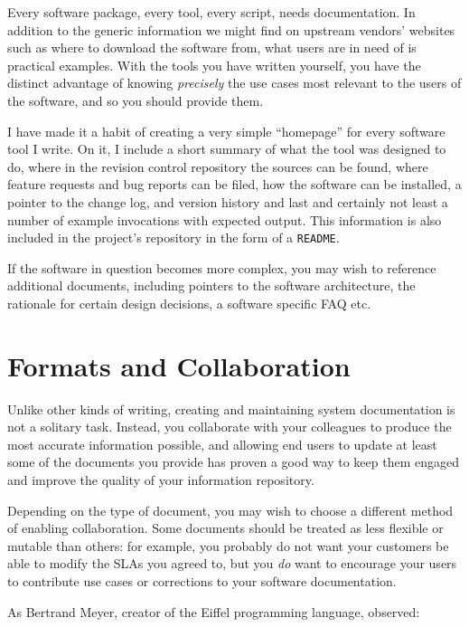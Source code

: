 Every software package, every tool, every script,
needs documentation.  In addition to the generic
information we might find on upstream vendors'
websites such as where to download the software from,
what users are in need of is practical examples.  With
the tools you have written yourself, you have the
distinct advantage of knowing {\em precisely} the use
cases most relevant to the users of the software, and
so you should provide them.

I have made it a habit of creating a very simple
``homepage'' for every software tool I write.  On it,
I include a short summary of what the tool was
designed to do, where in the revision control
repository the sources can be found, where feature
requests and bug reports can be filed, how the
software can be installed, a pointer to the change
log, and version history and last and certainly not
least a number of example invocations with expected
output.  This information is also included in the
project's repository in the form of a {\tt README}.

If the software in question becomes more complex, you
may wish to reference additional documents, including
pointers to the software architecture, the rationale
for certain design decisions, a software specific FAQ
etc.

\section{Formats and Collaboration}
\label{documentation:formats-and-collaboration}

Unlike other kinds of writing, creating and
maintaining system documentation is not a solitary
task.  Instead, you collaborate with your colleagues
to produce the most accurate information possible, and
allowing end users to update at least some of the
documents you provide has proven a good way to keep
them engaged and improve the quality of your
information repository.

Depending on the type of document, you may wish to
choose a different method of enabling collaboration.
Some documents should be treated as less flexible or
mutable than others: for example, you probably do not
want your customers be able to modify the SLAs you
agreed to, but you {\em do} want to encourage your
users to contribute use cases or corrections to your
software documentation.

As Bertrand Meyer,
creator of the Eiffel programming language,
observed:

